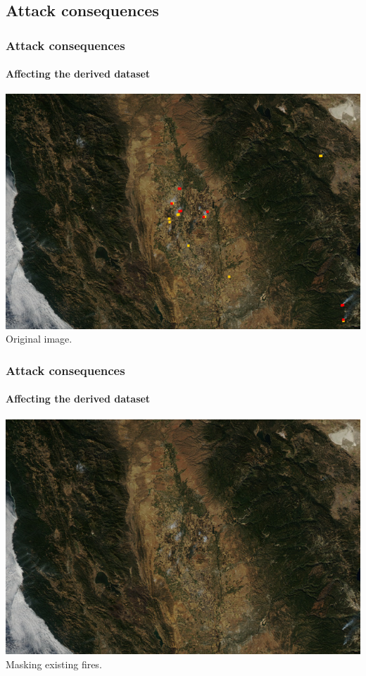 \documentclass{beamer}
\begin{document}
\subsection{Attack consequences}

\begin{frame}
  \frametitle{Attack consequences}
  \framesubtitle{Affecting the derived dataset}
  \includegraphics[width=\textwidth]{images/injection/original.jpg}
  \newline
  \centering
  Original image.
\end{frame}

\begin{frame}
  \frametitle{Attack consequences}
  \framesubtitle{Affecting the derived dataset}
  \includegraphics[width=\textwidth]{images/injection/masked_0.jpg}
  \newline
  \centering
  Masking existing fires.
\end{frame}
\end{document}
